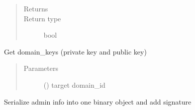 \documentclass[letterpaper,10pt,english]{sphinxmanual}
\begin{document}
\begin{fulllineitems}
\begin{fulllineitems}
\begin{quote}
\begin{description}
\item[{Returns}] \leavevmode


\item[{Return type}] \leavevmode
bool

\end{description}\end{quote}

\end{fulllineitems}


\begin{fulllineitems}
\label{\detokenize{bbc1.core.bbc_network:bbc1.core.bbc_network.BBcNetwork.get_domain_keypair}}
Get domain\_keys (private key and public key)
\begin{quote}\begin{description}
\item[{Parameters}] \leavevmode
{} () \textendash{} target domain\_id

\end{description}\end{quote}

\end{fulllineitems}


\begin{fulllineitems}
\label{\detokenize{bbc1.core.bbc_network:bbc1.core.bbc_network.BBcNetwork.include_admin_info_into_message_if_needed}}
Serialize admin info into one binary object and add signature

\end{fulllineitems}



\end{fulllineitems}
\end{document}
